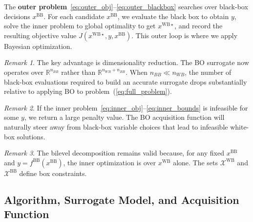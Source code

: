 \documentclass[12pt,a4paper]{article}%
\theoremstyle{plain}%
\theoremstyle{remark}%
\newtheorem{remark}{Remark}%
\theoremstyle{definition}%
\def\WB{\mathrm{WB}}
\def\BB{\mathrm{BB}}
\begin{document}
The \textbf{outer problem}~\eqref{eq:outer_obj}--\eqref{eq:outer_blackbox} searches over black-box decisions $x^{\BB}$. For each candidate $x^{\BB}$, we evaluate the black box to obtain $y$, solve the inner problem to global optimality to get $x^{\WB\star}$, and record the resulting objective value $J(x^{\WB\star}, y, x^{\BB})$. This outer loop is where we apply Bayesian optimization.

\begin{remark}
The key advantage is dimensionality reduction. The BO surrogate now operates over $\mathbb{R}^{n_{BB}}$ rather than $\mathbb{R}^{n_{WB} + n_{BB}}$. When $n_{BB} \ll n_{WB}$, the number of black-box evaluations required to build an accurate surrogate drops substantially relative to applying BO to problem~(\ref{eq:full_problem}). 
\end{remark}

\begin{remark}
If the inner problem~\eqref{eq:inner_obj}--\eqref{eq:inner_bounds} is infeasible for some $y$, we return a large penalty value. The BO acquisition function will naturally steer away from black-box variable choices that lead to infeasible white-box solutions.
\end{remark}

\begin{remark}
    The bilevel decomposition remains valid because, for any fixed $x^{\BB}$ and $y = f^{\BB}(x^{\BB})$, the inner optimization is over $x^{\WB}$ alone. The sets $\mathcal{X}^{\WB}$ and $\mathcal{X}^{\BB}$ define box constraints.
\end{remark}

\subsection{Algorithm, Surrogate Model, and Acquisition Function}\label{subsec:algorithm}
\end{document}
